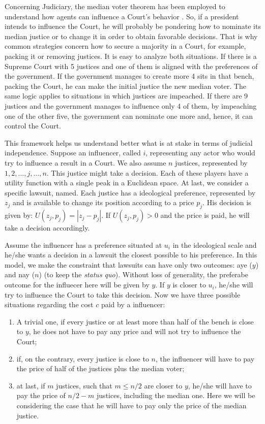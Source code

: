 \documentclass[12pt, a4paper]{article}
\begin{document}
Concerning Judiciary, the median voter theorem has been employed to 
understand how agents can influence a Court's 
behavior \citep{martin2004median}. So, if a president  
intends to influence the Court, he will probably be 
pondering how to nominate its median justice or to 
change it in order to obtain favorable decisions. 
That is why common strategies concern how to secure a 
majority in a Court, for example, packing it or 
removing justices. It is easy to analyze both situations. 
If there is a Supreme Court with 5 justices and one of 
them is aligned with the preferences of the government. 
If the government manages to create more 4 sits in that 
bench, packing the Court, he can make the initial 
justice the new median voter. The same logic applies 
to situations in which justices are impeached. 
If there are 9 justices and the government manages 
to influence only 4 of them, by impeaching 
one of the other five, the government can 
nominate one more and, hence, it can control the Court.

This framework helps us understand better what is at stake
in terms of judicial independence.
Suppose an influencer, called $i$, representing any actor
who would try to influence a result in a Court. 
We also assume $n$ justices, represented by $1, 2, ..., j, ...,  n$. 
This justice might take a decision. Each of these players 
have a utility function with a single peak in a Euclidean space.  
At last, we consider a specific lawsuit, named.
Each justice has a ideological preference, represented by $z_j$ and 
is available to change its position according to 
a price $p_j$. His decision is given by: $U(z_j, p_j) = |z_j - p_j|$.
If $U(z_j, p_j) > 0$ and the price is paid, he will take a decision
accordingly.

Assume the influencer has a preference situated 
at $u_i$ in the ideological scale and he/she wants a decision
in a lawsuit the closest possible to his preference.
In this model, we make the constraint that lawsuits can have
only two outcomes: aye ($y$) and nay ($n$) (to keep the \emph{status quo}). Without loss of
generality, the preferabe outcome for the influecer here will
be given by $y$. If $y$ is closer to $u_i$,
he/she will try to influence the Court to take this decision.
Now we have three possible situations regarding the cost $c$ paid
by a influencer: 
\begin{enumerate}
	\item A trivial one, 
if every justice or at least more than half of the bench 
is close to  $y$, he does not have to pay 
any price and will not try to influence the Court;
     \item if, on the contrary, every justice is close to $n$, 
the influencer will have to pay the price of half of the justices
plus the median voter;  
     \item at last, if $m$ justices, such that $m \leq n/2$ are closer to $y$,
he/she will have to pay the price of $n/2 - m$ justices, including the
median one. Here we will be considering the case that he will have to pay
only the price of the median justice.
\end{enumerate}
\end{document}
